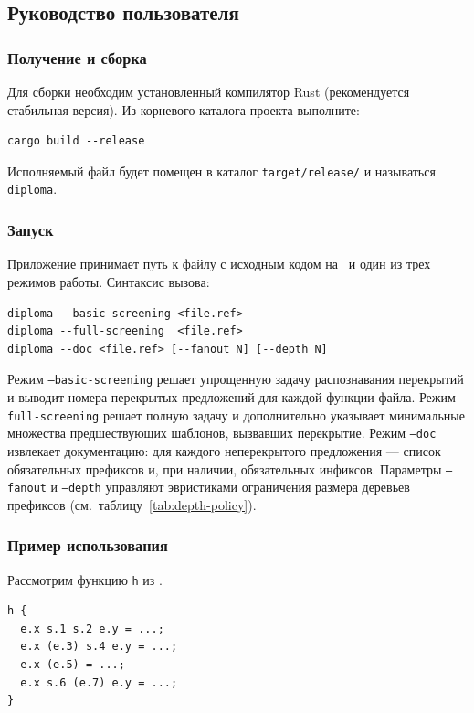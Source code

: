 \subsection{Руководство пользователя}
\label{sec:user-guide}

\subsubsection{Получение и сборка}

Для сборки необходим установленный компилятор Rust (рекомендуется стабильная версия).
Из корневого каталога проекта выполните:
\begin{verbatim}
cargo build --release
\end{verbatim}
Исполняемый файл будет помещен в каталог \texttt{target/release/} и называться \texttt{diploma}.

\subsubsection{Запуск}

Приложение принимает путь к файлу с исходным кодом на \RL\ и один из трех режимов работы.
Синтаксис вызова:
\begin{verbatim}
diploma --basic-screening <file.ref>
diploma --full-screening  <file.ref>
diploma --doc <file.ref> [--fanout N] [--depth N]
\end{verbatim}

Режим \texttt{--basic-screening} решает упрощенную задачу распознавания перекрытий и выводит номера перекрытых предложений для каждой функции файла.
Режим \texttt{--full-screening} решает полную задачу и дополнительно указывает минимальные множества предшествующих шаблонов, вызвавших перекрытие.
Режим \texttt{--doc} извлекает документацию: для каждого неперекрытого предложения --- список обязательных префиксов и, при наличии, обязательных инфиксов.
Параметры \texttt{--fanout} и \texttt{--depth} управляют эвристиками ограничения размера деревьев префиксов (см.~таблицу~\ref{tab:depth-policy}).

\subsubsection{Пример использования}

Рассмотрим функцию \texttt{h} из .

\begin{listing}[H]
\caption{Пример функции с экранированием}
\label{lst:overlap-example}
\begin{verbatim}
h {
  e.x s.1 s.2 e.y = ...;
  e.x (e.3) s.4 e.y = ...;
  e.x (e.5) = ...;
  e.x s.6 (e.7) e.y = ...;
}
\end{verbatim}
\end{listing}

